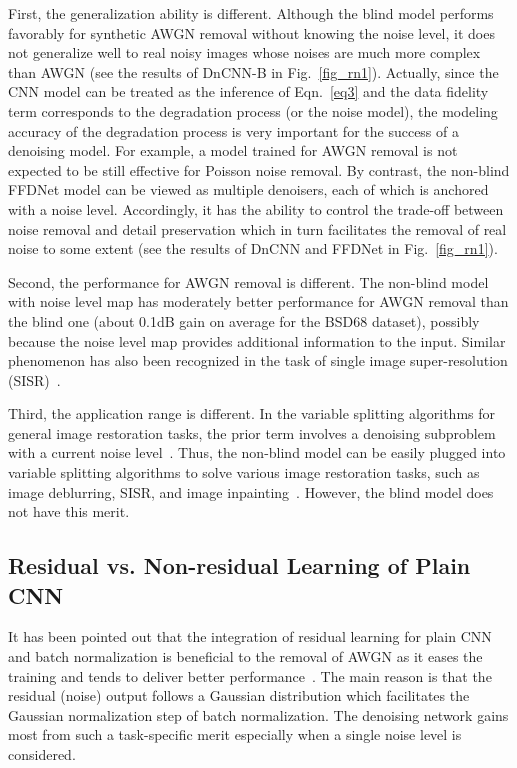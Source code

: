 \documentclass[journal]{IEEEtran}
\begin{document}
First, the generalization ability is different. Although the blind model performs favorably for synthetic AWGN removal without knowing the noise level,
it does not generalize well to real noisy images whose noises are much more complex than AWGN (see the results of DnCNN-B in Fig.~\ref{fig_rn1}). Actually, since the CNN model can be
treated as the inference of Eqn.~\eqref{eq3} and the data fidelity term corresponds to the degradation process (or the noise model),
the modeling accuracy of the degradation process is very important for the success of a denoising model.
For example, a model trained for AWGN removal is not expected to be still effective for Poisson noise removal.
By contrast, the non-blind FFDNet model can be viewed as multiple denoisers,
each of which is anchored with a noise level.
Accordingly, it has the ability to control the trade-off between noise removal and detail preservation which in turn facilitates the removal of real noise to some extent (see the results of DnCNN and FFDNet in Fig.~\ref{fig_rn1}).

Second, the performance for AWGN removal is different. The non-blind model with noise level map has moderately better performance for AWGN removal than the blind one (about 0.1dB gain on average for the BSD68 dataset),
possibly because the noise level map provides additional information to the input.
Similar phenomenon has also been recognized in the task of single image super-resolution (SISR)~\cite{riegler2015conditioned}.

Third, the application range is different. In the variable splitting algorithms for general image restoration tasks,
the prior term involves a denoising subproblem with a current noise level~\cite{afonso2010fast,heide2014flexisp,romano2016little}.
Thus, the non-blind model can be easily plugged into variable splitting algorithms to solve various image restoration tasks, such as
image deblurring, SISR, and image inpainting~\cite{chan2016plug,zhang2017learning}. However, the blind model does not have this merit.

\subsection{Residual vs. Non-residual Learning of Plain CNN}\label{section_residual}

It has been pointed out that the integration of residual learning for plain CNN and batch normalization is beneficial to the removal of AWGN
as it eases the training and tends to deliver better performance~\cite{zhang2017beyond}.
The main reason is that the residual (noise) output follows a Gaussian distribution which facilitates the Gaussian normalization step of batch normalization.
The denoising network gains most from such a task-specific merit especially when a single noise level is considered.
\end{document}
